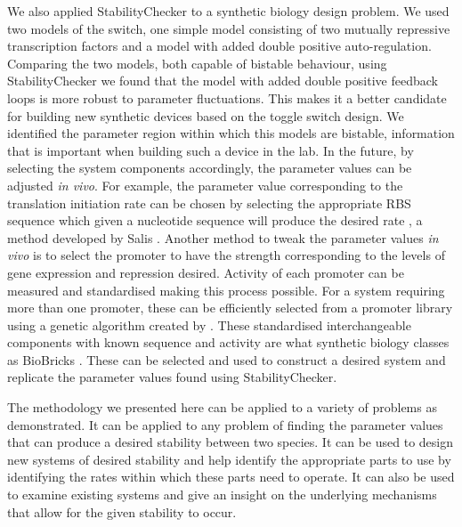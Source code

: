 We also applied StabilityChecker to a synthetic biology design problem. We used two models of the switch, one simple model consisting of two mutually repressive transcription factors and a model with added double positive auto-regulation. Comparing the two models, both capable of bistable behaviour, using StabilityChecker we found that the model with added double positive feedback loops is more robust to parameter fluctuations. This makes it a better candidate for building new synthetic devices based on the toggle switch design. We identified the parameter region within which this models are bistable, information that is important when building such a device in the lab. In the future, by selecting the system components accordingly, the parameter values can be adjusted \textit{in vivo}. For example, the parameter value corresponding to the translation initiation rate can be chosen by selecting the appropriate RBS sequence which given a nucleotide sequence will produce the desired rate \autocite{Holtz:2010bm}, a method developed by Salis \autocite{Salis:2009gk}. Another method to tweak the parameter values \textit{in vivo} is to select the promoter to have the strength corresponding to the levels of gene expression and repression desired. Activity of each promoter can be measured and standardised \autocite{Kelly:2009bj} making this process possible. For a system requiring more than one promoter, these can be efficiently selected from a promoter library using a genetic algorithm created by \textcite{Wu:2011bq}. These standardised interchangeable components with known sequence and activity are what synthetic biology classes as BioBricks \autocite{Kelly:2009bj,Canton:2008fv}. These can be selected and used to construct a desired system and replicate the parameter values found using StabilityChecker.

The methodology we presented here can be applied to a variety of problems as demonstrated. It can be applied to any problem of finding the parameter values that can produce a desired stability between two species. It can be used to design new systems of desired stability and help identify the appropriate parts to use by identifying the rates within which these parts need to operate. It can also be used to examine existing systems and give an insight on the underlying mechanisms that allow for the given stability to occur. 


